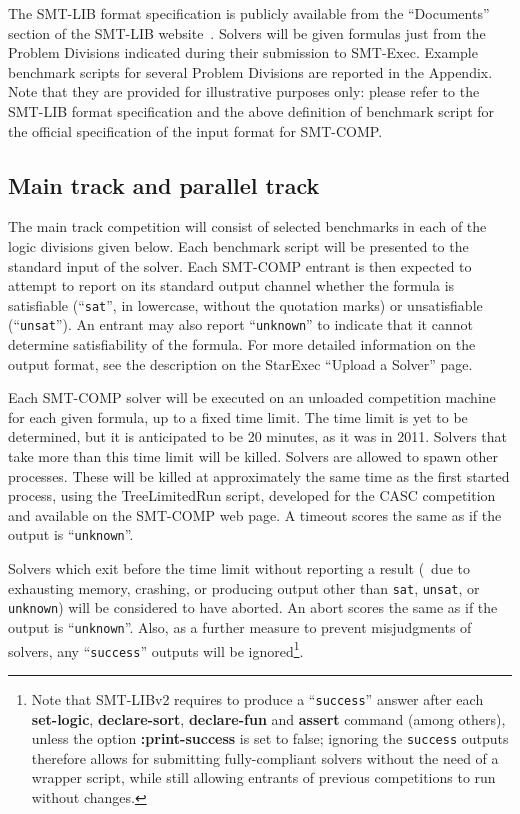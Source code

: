 \documentclass[12pt]{article}
\newcommand{\akey}[1]{\textbf{#1}}
\begin{document}
  
\noindent The SMT-LIB format specification is publicly
available from the ``Documents'' section of the SMT-LIB
website~\cite{SMT-LIB}.  Solvers will be given formulas just from the
Problem Divisions indicated during their submission to SMT-Exec.
Example benchmark scripts for several Problem Divisions are reported in the Appendix.
Note that they are provided for illustrative purposes only: 
please refer to the SMT-LIB format specification 
and the above definition of benchmark script for the official specification 
of the input format for SMT-COMP.

\subsection{Main track and parallel track}
\label{sec:exec:main}

The main track competition will consist of selected benchmarks in each of the
logic divisions given below.
Each benchmark script will be presented to the standard input of the solver.
Each SMT-COMP entrant is then expected to attempt to report on its
standard output channel whether the formula is satisfiable
(``\texttt{sat}'', in lowercase, without the quotation marks) or unsatisfiable
(``\texttt{unsat}'').  An entrant may also report ``\texttt{unknown}''
to indicate that it cannot determine satisfiability of the formula.
For more detailed information on the output format, see the
description on the StarExec ``Upload a Solver'' page.  %

Each SMT-COMP solver will be executed on an
unloaded competition machine for each given formula, up to a fixed
time limit.  The time limit is yet to be determined, but it is
anticipated to be 20 minutes, as it was in 2011.  Solvers that take more than this
time limit will be killed.  Solvers are allowed to spawn other
processes.  These will be killed at approximately the same time as the
first started process, using the TreeLimitedRun script, developed for
the CASC competition and available on the SMT-COMP web page.  A
timeout scores the same as if the output is ``\texttt{unknown}''.

Solvers which exit before the time
limit without reporting a result (\ie\ due to exhausting memory, crashing,
or producing output other than \texttt{sat}, \texttt{unsat}, or
\texttt{unknown})
will be considered to have aborted. 
An abort scores the same as if the output is ``\texttt{unknown}''. 
Also, as a further measure to prevent misjudgments of solvers,
any  ``\texttt{success}'' outputs will be 
ignored\footnote{
Note that SMT-LIBv2 requires to produce a ``\texttt{success}'' answer
after each \akey{set-logic}, \akey{declare-sort}, \akey{declare-fun} and
\akey{assert} command (among others), unless the option
\akey{:print-success} is set to false; ignoring the
\texttt{success} outputs therefore allows for submitting fully-compliant
solvers without the need of a wrapper script, while still allowing entrants
of previous competitions to run without changes.}.
\end{document}
